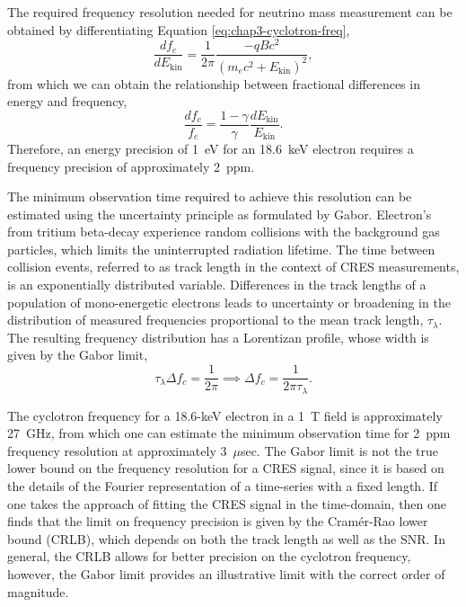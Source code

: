 The required frequency resolution needed for neutrino mass measurement can be obtained by differentiating Equation \ref{eq:chap3-cyclotron-freq},
\begin{equation}
    \frac{df_c}{dE_\mathrm{kin}} = \frac{1}{2\pi}\frac{-qBc^2}{\left(m_ec^2+E_\mathrm{kin}\right)^2},
\end{equation}
from which we can obtain the relationship between fractional differences in energy and frequency,
\begin{equation}
    \frac{df_c}{f_c}=\frac{1-\gamma}{\gamma}\frac{dE_\mathrm{kin}}{E_\mathrm{kin}}.
\end{equation}
Therefore, an energy precision of 1~eV for an 18.6~keV electron requires a frequency precision of approximately 2~ppm.

The minimum observation time required to achieve this resolution can be estimated using the uncertainty principle as formulated by Gabor. Electron's from tritium beta-decay experience random collisions with the background gas particles, which limits the uninterrupted radiation lifetime. The time between collision events, referred to as track length in the context of CRES measurements, is an exponentially distributed variable. Differences in the track lengths of a population of mono-energetic electrons leads to uncertainty or broadening in the distribution of measured frequencies proportional to the mean track length, $\tau_\lambda$. The resulting frequency distribution has a Lorentizan profile, whose width is given by the Gabor limit,
\begin{equation}
    \tau_\lambda\Delta f_c=\frac{1}{2\pi}\implies\Delta f_c=\frac{1}{2\pi\tau_\lambda}.
\end{equation}

The cyclotron frequency for a 18.6-keV electron in a 1~T field is approximately 27~GHz, from which one can estimate the minimum observation time for 2~ppm frequency resolution at approximately 3~$\mu$sec. The Gabor limit is not the true lower bound on the frequency resolution for a CRES signal, since it is based on the details of the Fourier representation of a time-series with a fixed length. If one takes the approach of fitting the CRES signal in the time-domain, then one finds that the limit on frequency precision is given by the Cram\'{e}r-Rao lower bound (CRLB), which depends on both the track length as well as the SNR. In general, the CRLB allows for better precision on the cyclotron frequency, however, the Gabor limit provides an illustrative limit with the correct order of magnitude.  

